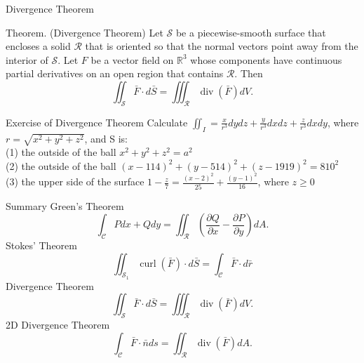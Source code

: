 \documentclass{beamer}
\begin{document}
    \begin{frame}{Divergence Theorem}
        \par \textcolor{yy}{Theorem. (Divergence Theorem)} Let $\mathcal{S}$ be a piecewise-smooth surface that encloses a solid $\mathcal{R}$ that is oriented so that the normal vectors point away from the interior of $\mathcal{S}$. Let $F$ be a vector field on $\mathbb{R}^3$ whose components have continuous partial derivatives on an open region that contains $\mathcal{R}$. Then 
        \begin{equation*}
            \iint_{\mathcal{S}} \bar{F} \cdot d\bar{S} = \iiint_{\mathcal{R}} \operatorname{div}(\bar{F}) dV.
        \end{equation*}
    \end{frame}


    \begin{frame}{Exercise of Divergence Theorem}
    Calculate $\iint_I=\frac{x}{r^3}dydz+\frac{y}{r^3}dxdz+\frac{z}{r^3}dxdy$, where $r=\sqrt{x^2+y^2+z^2}$, and S is:\\  
        (1) the outside of the ball $x^2+y^2+z^2=a^2$\\
        (2) the outside of the ball $(x-114)^2+(y-514)^2+(z-1919)^2=810^2$\\
        (3) the upper side of the surface $1-\frac{z}{7}=\frac{(x-2)^2}{25}+\frac{(y-1)^2}{16}$, where $z\geq 0$
        
    \end{frame}

    \begin{frame}{Summary}
    Green's Theorem\\
        \begin{equation*}
            \int_{\mathcal{C}} Pdx + Qdy = \iint_{\mathcal{R}} \left( \dfrac{\partial Q}{\partial x} - \dfrac{\partial P}{\partial y}\right) dA.
        \end{equation*}
        Stokes' Theorem\\
        \begin{equation*}
            \iint_{\mathcal{S}_1} \operatorname{curl}(\bar{F}) \cdot d \bar{S} = \int_{\mathcal{C}} \bar{F} \cdot d \bar{r}
        \end{equation*}
        Divergence Theorem\\
        \begin{equation*}
            \iint_{\mathcal{S}} \bar{F} \cdot d\bar{S} = \iiint_{\mathcal{R}} \operatorname{div}(\bar{F}) dV.
        \end{equation*}
        2D Divergence Theorem\\
        \begin{equation*}
            \int_{\mathcal{C}} \bar{F} \cdot\bar{n} ds = \iint_{\mathcal{R}} \operatorname{div}(\bar{F}) dA.
        \end{equation*}
    \end{frame}
\end{document}
